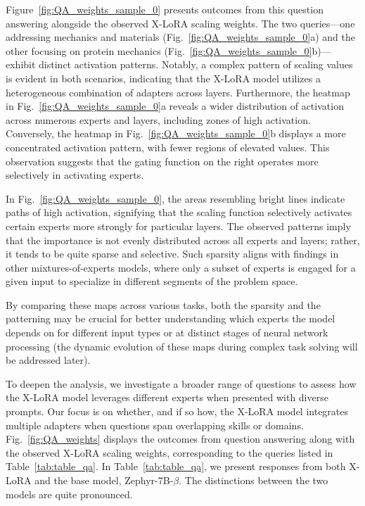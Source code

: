 Figure~\ref{fig:QA_weights_sample_0} presents outcomes from this question answering alongside the observed X-LoRA scaling weights. The two queries—one addressing mechanics and materials (Fig.~\ref{fig:QA_weights_sample_0}a) and the other focusing on protein mechanics (Fig.~\ref{fig:QA_weights_sample_0}b)—exhibit distinct activation patterns. Notably, a complex pattern of scaling values is evident in both scenarios, indicating that the X-LoRA model utilizes a heterogeneous combination of adapters across layers. Furthermore, the heatmap in Fig.~\ref{fig:QA_weights_sample_0}a reveals a wider distribution of activation across numerous experts and layers, including zones of high activation. Conversely, the heatmap in Fig.~\ref{fig:QA_weights_sample_0}b displays a more concentrated activation pattern, with fewer regions of elevated values. This observation suggests that the gating function on the right operates more selectively in activating experts.

In Fig.~\ref{fig:QA_weights_sample_0}, the areas resembling bright lines indicate paths of high activation, signifying that the scaling function selectively activates certain experts more strongly for particular layers. The observed patterns imply that the importance is not evenly distributed across all experts and layers; rather, it tends to be quite sparse and selective. Such sparsity aligns with findings in other mixtures-of-experts models, where only a subset of experts is engaged for a given input to specialize in different segments of the problem space.

By comparing these maps across various tasks, both the sparsity and the patterning may be crucial for better understanding which experts the model depends on for different input types or at distinct stages of neural network processing (the dynamic evolution of these maps during complex task solving will be addressed later). 

To deepen the analysis, we investigate a broader range of questions to assess how the X-LoRA model leverages different experts when presented with diverse prompts. Our focus is on whether, and if so how, the X-LoRA model integrates multiple adapters when questions span overlapping skills or domains. Fig.~\ref{fig:QA_weights} displays the outcomes from question answering along with the observed X-LoRA scaling weights, corresponding to the queries listed in Table~\ref{tab:table_qa}. In Table~\ref{tab:table_qa}, we present responses from both X-LoRA and the base model, Zephyr-7B-$\beta$. The distinctions between the two models are quite pronounced.

